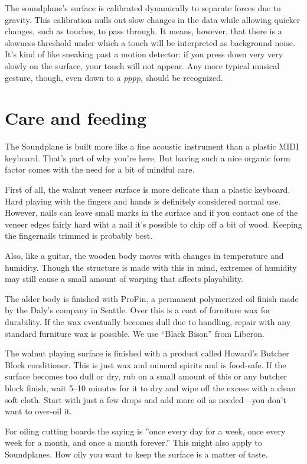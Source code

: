 The soundplane's surface is calibrated dynamically to separate forces due to gravity.  This calibration nulls out slow changes in the data while allowing quicker changes, such as touches, to pass through.  It means, however, that there is a slowness threshold under which a touch will be interpreted as background noise.  It's kind of like sneaking past a motion detector: if you press down very very slowly on the surface, your touch will not appear.  Any more typical musical gesture, though, even down to a \emph{pppp,} should be recognized.


\chapter{Care and feeding}

The Soundplane is built more like a fine acoustic instrument than a plastic MIDI keyboard.  That's part of why you're here.  But having such a nice organic form factor comes with the need for a bit of mindful care.  

First of all, the walnut veneer surface is more delicate than a plastic keyboard.  Hard playing with the fingers and hands is definitely considered normal use.  However, nails can leave small marks in the surface and if you contact one of the veneer edges fairly hard wiht a nail it's possible to chip off a bit of wood.  Keeping the fingernails trimmed is probably best.  

Also, like a guitar, the wooden body moves with changes in temperature and humidity.  Though the structure is made with this in mind, extremes of humidity may still cause a small amount of warping that affects playability.  

The alder body is finished with ProFin, a permanent polymerized oil finish made by the Daly’s company in Seattle.  Over this is a coat of furniture wax for durability.  If the wax eventually becomes dull due to handling, repair with any standard furniture wax is possible.  We use “Black Bison” from Liberon.  

The walnut playing surface is finished with a product called Howard’s Butcher Block conditioner.  This is just wax and mineral spirits and is food-safe.  If the surface becomes too dull or dry, rub on a small amount of this or any butcher block finish, wait 5–10 minutes for it to dry and wipe off the excess with a clean soft cloth.  Start with just a few drops and add more oil as needed—you don't want to over-oil it.  

For oiling cutting boards the saying is ”once every day for a week, once every week for a month, and once a month forever.”  This might also apply to Soundplanes.  How oily you want to keep the surface is a matter of taste.  

